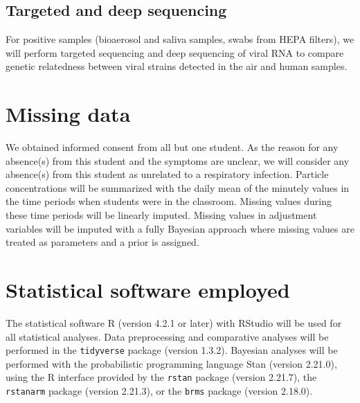\documentclass{article}
\begin{document}
\subsection{Targeted and deep sequencing}

For positive samples (bioaerosol and saliva samples, swabs from HEPA filters), we will perform targeted sequencing and deep sequencing of viral RNA to compare genetic relatedness between viral strains detected in the air and human samples\cite{Goncalves2021}.

\section{Missing data}

We obtained informed consent from all but one student. As the reason for any absence(s) from this student and the symptoms are unclear, we will consider any absence(s) from this student as unrelated to a respiratory infection. Particle concentrations will be summarized with the daily mean of the minutely values in the time periods when students were in the classroom. Missing values during these time periods will be linearly imputed. Missing values in adjustment variables will be imputed with a fully Bayesian approach where missing values are treated as parameters and a prior is assigned. 

\section{Statistical software employed}

The statistical software R (version 4.2.1 or later) with RStudio will be used for all statistical analyses. Data preprocessing and comparative analyses will be performed in the \texttt{tidyverse} package (version 1.3.2). Bayesian analyses will be performed with the probabilistic programming language Stan (version 2.21.0), using the R interface provided by the \texttt{rstan} package (version 2.21.7), the \texttt{rstanarm} package (version 2.21.3), or the \texttt{brms} package (version 2.18.0).
\end{document}
